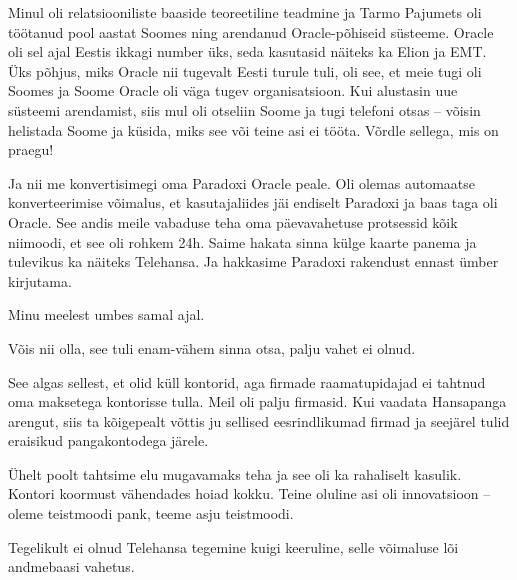 Minul oli relatsiooniliste baaside teoreetiline 
teadmine ja Tarmo Pajumets oli töötanud pool 
aastat Soomes ning arendanud Oracle-põhiseid süsteeme. Oracle oli 
sel ajal Eestis ikkagi number üks, seda kasutasid näiteks ka Elion ja EMT. Üks põhjus, miks 
Oracle nii tugevalt Eesti turule tuli, oli see, et meie tugi oli Soomes 
ja Soome Oracle oli väga tugev organisatsioon. Kui alustasin uue süsteemi 
arendamist, siis mul oli otseliin Soome ja tugi telefoni otsas -- võisin helistada Soome ja küsida, miks see või teine asi ei tööta. Võrdle sellega, mis on praegu!

Ja nii me konvertisimegi oma Paradoxi 
Oracle peale. Oli olemas automaatse konverteerimise võimalus, 
et kasutajaliides jäi endiselt Paradoxi ja baas taga oli Oracle. See andis 
meile vabaduse teha oma päevavahetuse protsessid kõik 
niimoodi, et see oli rohkem 24h. Saime hakata sinna külge kaarte panema ja 
tulevikus ka näiteks Telehansa. Ja hakkasime Paradoxi rakendust ennast ümber 
kirjutama. 


Minu meelest umbes samal ajal.


Võis nii olla, see tuli enam-vähem sinna otsa, palju 
vahet ei olnud. 


See algas sellest, et olid küll kontorid, aga firmade raamatupidajad ei 
tahtnud oma maksetega kontorisse tulla. Meil 
oli palju firmasid. Kui vaadata Hansapanga arengut, siis ta 
kõigepealt võttis ju sellised eesrindlikumad firmad ja seejärel tulid eraisikud 
pangakontodega järele. 

Ühelt poolt tahtsime elu mugavamaks teha ja see oli ka
rahaliselt kasulik. Kontori koormust vähendades hoiad kokku. Teine oluline asi oli
innovatsioon -- oleme teistmoodi pank, 
teeme asju teistmoodi. 


Tegelikult ei olnud Telehansa tegemine kuigi keeruline, selle võimaluse lõi
andmebaasi vahetus. 


